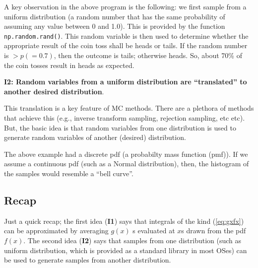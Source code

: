 \documentclass[11pt,onecolumn]{article}
\begin{document}
A key observation in the above program is the following: we first sample from a uniform distribution (a random number that has the same probability of assuming any value between 0 and 1.0). This is provided by the function {\texttt{np.random.rand()}}. This random variable is then used to determine whether the appropriate result of the coin toss shall be heads or tails. If the random number is $> p (= 0.7)$, then the outcome is tails; otherwise heads. So, about 70\% of the coin tosses result in heads as expected.

{\bf I2: Random variables from a uniform distribution are ``translated'' to another desired distribution}. 

This translation is a key feature of MC methods. There are a plethora of methods that achieve this (e.g., inverse transform sampling, rejection sampling, etc etc). But, the basic idea is that random variables from one distribution is used to generate random variables of another (desired) distribution.

The above example had a discrete pdf (a probabilty mass function (pmf)). If we assume a continuous pdf (such as a Normal distribution), then, the histogram of the samples would resemble a ``bell curve''.

\subsection{Recap}
Just a quick recap; the first idea ({\bf I1}) says that integrals of the kind (\ref{eq:gxfx}) can be approximated by averaging $g(x)$ s evaluated at $x$s drawn from the pdf $f(x)$. The second idea ({\bf I2}) says that samples from one distribution (such as uniform distribution, which is provided as a standard library in most OSes) can be used to generate samples from another distribution.
\end{document}

